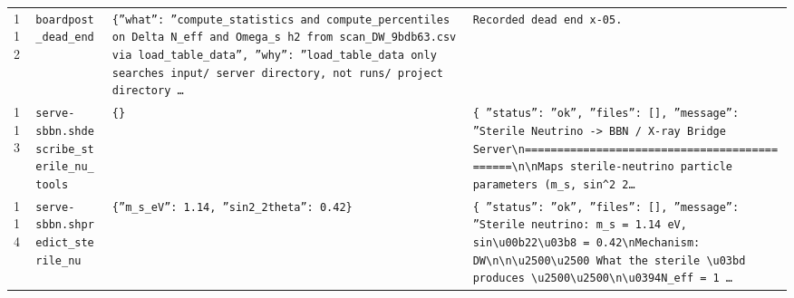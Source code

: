 \documentclass[11pt,a4paper]{article}
\begin{document}
\begin{longtable}{@{}p{}p{}p{}p{}@{}}
112 & \texttt{board}\newline\texttt{post\_\allowbreak{}dead\_\allowbreak{}end} & \texttt{\{''what'':\allowbreak{} ''compute\_\allowbreak{}statistics and compute\_\allowbreak{}percentiles on Delta N\_\allowbreak{}eff and Omega\_\allowbreak{}s h2 from scan\_\allowbreak{}DW\_\allowbreak{}9bdb63.csv via load\_\allowbreak{}table\_\allowbreak{}data'',\allowbreak{} ''why'':\allowbreak{} ''load\_\allowbreak{}table\_\allowbreak{}data only searches input/\allowbreak{} server directory,\allowbreak{} not runs/\allowbreak{} project directory \ldots{}\allowbreak{}} & \texttt{Recorded dead end x-05.} \\
113 & \texttt{serve-sbbn.sh}\newline\texttt{describe\_\allowbreak{}sterile\_\allowbreak{}nu\_\allowbreak{}tools} & \texttt{\{\}\allowbreak{}} & \texttt{\{   ''status'':\allowbreak{} ''ok'',\allowbreak{}   ''files'':\allowbreak{} []\allowbreak{},\allowbreak{}   ''message'':\allowbreak{} ''Sterile Neutrino -\textgreater{}\allowbreak{} BBN /\allowbreak{} X-ray Bridge Server\textbackslash{}\allowbreak{}n=\allowbreak{}=\allowbreak{}=\allowbreak{}=\allowbreak{}=\allowbreak{}=\allowbreak{}=\allowbreak{}=\allowbreak{}=\allowbreak{}=\allowbreak{}=\allowbreak{}=\allowbreak{}=\allowbreak{}=\allowbreak{}=\allowbreak{}=\allowbreak{}=\allowbreak{}=\allowbreak{}=\allowbreak{}=\allowbreak{}=\allowbreak{}=\allowbreak{}=\allowbreak{}=\allowbreak{}=\allowbreak{}=\allowbreak{}=\allowbreak{}=\allowbreak{}=\allowbreak{}=\allowbreak{}=\allowbreak{}=\allowbreak{}=\allowbreak{}=\allowbreak{}=\allowbreak{}=\allowbreak{}=\allowbreak{}=\allowbreak{}=\allowbreak{}=\allowbreak{}=\allowbreak{}=\allowbreak{}=\allowbreak{}=\allowbreak{}=\allowbreak{}\textbackslash{}\allowbreak{}n\textbackslash{}\allowbreak{}nMaps sterile-neutrino particle parameters (m\_\allowbreak{}s,\allowbreak{} sin\textasciicircum{}\allowbreak{}2 2\ldots{}\allowbreak{}} \\
114 & \texttt{serve-sbbn.sh}\newline\texttt{predict\_\allowbreak{}sterile\_\allowbreak{}nu} & \texttt{\{''m\_\allowbreak{}s\_\allowbreak{}eV'':\allowbreak{} 1.14,\allowbreak{} ''sin2\_\allowbreak{}2theta'':\allowbreak{} 0.42\}\allowbreak{}} & \texttt{\{   ''status'':\allowbreak{} ''ok'',\allowbreak{}   ''files'':\allowbreak{} []\allowbreak{},\allowbreak{}   ''message'':\allowbreak{} ''Sterile neutrino:\allowbreak{} m\_\allowbreak{}s =\allowbreak{} 1.14 eV,\allowbreak{} sin\textbackslash{}\allowbreak{}u00b22\textbackslash{}\allowbreak{}u03b8 =\allowbreak{} 0.42\textbackslash{}\allowbreak{}nMechanism:\allowbreak{} DW\textbackslash{}\allowbreak{}n\textbackslash{}\allowbreak{}n\textbackslash{}\allowbreak{}u2500\textbackslash{}\allowbreak{}u2500 What the sterile \textbackslash{}\allowbreak{}u03bd produces \textbackslash{}\allowbreak{}u2500\textbackslash{}\allowbreak{}u2500\textbackslash{}\allowbreak{}n\textbackslash{}\allowbreak{}u0394N\_\allowbreak{}eff =\allowbreak{} 1 \ldots{}\allowbreak{}} \\

\end{longtable}
\end{document}
